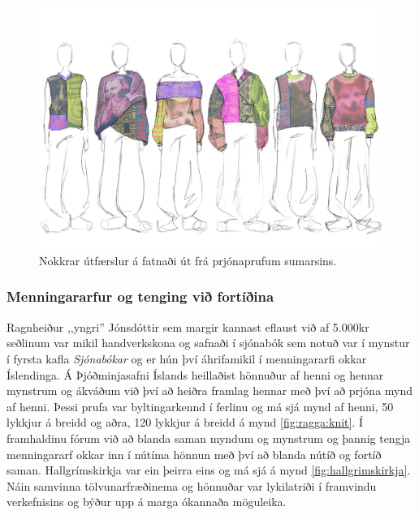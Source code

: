\begin{figure}[t]
    \centering
    \includegraphics[width=\linewidth]{myndir/gisa/collection.JPG}
    \caption{Nokkrar útfærslur á fatnaði út frá prjónaprufum sumarsins.}
    \label{fig:designproposal}
\end{figure}

\subsubsection{Menningararfur og tenging við fortíðina}
Ragnheiður ,,yngri'' Jónsdóttir sem margir kannast eflaust við af 5.000kr seðlinum var mikil handverkskona og safnaði í sjónabók sem notuð var í mynstur í fyrsta kafla \textit{Sjónabókar} og er hún því áhrifamikil í menningararfi okkar Íslendinga. Á Þjóðminjasafni Íslands heillaðist hönnuður af henni og hennar mynstrum og ákváðum við því að heiðra framlag hennar með því að prjóna mynd af henni. Þessi prufa var byltingarkennd í ferlinu og má sjá mynd af henni, 50 lykkjur á breidd og aðra, 120 lykkjur á breidd á mynd \ref{fig:ragga:knit}. Í framhaldinu fórum við að blanda saman myndum og mynstrum og þannig tengja menningararf okkar inn í nútíma hönnun með því að blanda nútíð og fortíð saman. Hallgrímskirkja var ein þeirra eins og má sjá á mynd \ref{fig:hallgrimskirkja}. Náin samvinna tölvunarfræðinema og hönnuðar var lykilatriði í framvindu verkefnisins og býður upp á marga ókannaða möguleika. 

